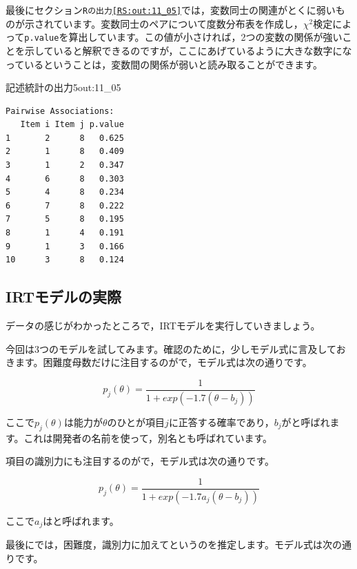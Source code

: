 \documentclass{ltjsbook}
\begin{document}
最後にセクション\texttt{Rの出力\ref{RS:out:11_05}}では，変数同士の関連がとくに弱いものが示されています。変数同士のペアについて度数分布表を作成し，$\chi^2$検定によって\texttt{p.value}を算出しています。この値が小さければ，2つの変数の関係が強いことを示していると解釈できるのですが，ここにあげているように大きな数字になっているということは，変数間の関係が弱いと読み取ることができます。
\begin{Rscreen}{記述統計の出力5}{out:11_05}
	\begin{verbatim}
Pairwise Associations:
   Item i Item j p.value
1       2      8   0.625
2       1      8   0.409
3       1      2   0.347
4       6      8   0.303
5       4      8   0.234
6       7      8   0.222
7       5      8   0.195
8       1      4   0.191
9       1      3   0.166
10      3      8   0.124
    \end{verbatim}
\end{Rscreen}
\subsection{IRTモデルの実際}
データの感じがわかったところで，IRTモデルを実行していきましょう。

今回は3つのモデルを試してみます。確認のために，少しモデル式に言及しておきます。困難度母数だけに注目するのがで，モデル式は次の通りです。

\[ p_j(\theta) = \frac{1}{1+exp(-1.7 (\theta -b_j))} \]

ここで$p_j(\theta)$は能力が$\theta$のひとが項目$j$に正答する確率であり，$b_j$がと呼ばれます。これは開発者の名前を使って，別名とも呼ばれています。

項目の識別力にも注目するのがで，モデル式は次の通りです。

\[ p_j(\theta) = \frac{1}{1+exp(-1.7 a_j(\theta -b_j))} \]

ここで$a_j$はと呼ばれます。

最後にでは，困難度，識別力に加えてというのを推定します。モデル式は次の通りです。
\end{document}
